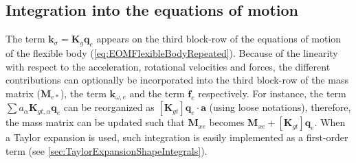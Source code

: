 \documentclass[wes, manuscript]{copernicus}
\renewcommand{\v}[1]{\boldsymbol{#1}}
\newcommand{\m}[1]{\boldsymbol{#1}}
\begin{document}





\subsection{Integration into the equations of motion}
The term $\v{k}_\sigma = \m{K}_g \v{q}_e$ appears on the third block-row of the equations of motion of the flexible body (\autoref{eq:EOMFlexibleBodyRepeated}).
Because of the linearity with respect to the acceleration, rotational velocities and forces, the different contributions can optionally be incorporated into the third block-row of the mass matrix ($\m{M}_{e*}$), the term $\v{k}_{\omega,e}$ and the term $\v{f}_e$ respectively. For instance, the term $\sum a_\alpha \m{K}_{gt,\alpha} \v{q}_e$ can be reorganized as $[\m{K}_{gt}]\v{q}_e \cdot \v{a}$ (using loose notations), therefore, the mass matrix can be updated such that $\m{M}_{xe}$ becomes $\m{M}_{xe}+[\m{K}_{gt}]\v{q}_e$. When a Taylor expansion is used, such integration is easily implemented as a first-order term (see \autoref{sec:TaylorExpansionShapeIntegrals}).
\end{document}
